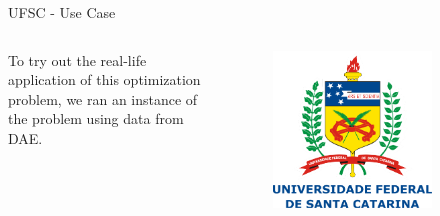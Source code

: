 \documentclass{beamer}
\begin{document}
\begin{frame}{UFSC - Use Case}
  \begin{columns}[c]
    \begin{column}{.5\textwidth}

	To try out the real-life application of this optimization problem, we ran an instance of the problem using data from DAE.

    \end{column}
    \begin{column}{.5\textwidth}

	\begin{figure}[h]
	    \centering
	    \includegraphics[width=0.8\textwidth]{UFSC.pdf}
	\end{figure}

    \end{column}
  \end{columns}
\end{frame}
\end{document}

